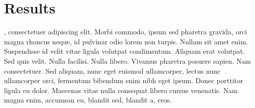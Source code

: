 \chapter{Results}\label{ch:5}

, consectetuer adipiscing elit. Morbi commodo,
ipsum sed pharetra gravida, orci magna rhoncus neque, id pulvinar odio lorem non turpis.
Nullam sit amet enim. Suspendisse id velit vitae ligula volutpat condimentum. Aliquam
erat volutpat. Sed quis velit. Nulla facilisi. Nulla libero. Vivamus pharetra posuere
sapien. Nam consectetuer. Sed aliquam, nunc eget euismod ullamcorper, lectus nunc
ullamcorper orci, fermentum bibendum enim nibh eget ipsum. Donec porttitor ligula eu
dolor. Maecenas vitae nulla consequat libero cursus venenatis. Nam magna enim, accumsan
eu, blandit sed, blandit a, eros.